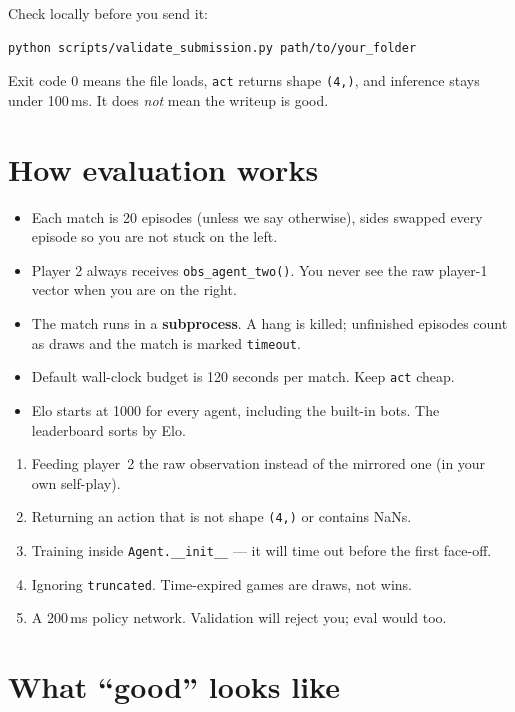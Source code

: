 \documentclass[11pt,a4paper]{article}
\begin{document}
Check locally before you send it:

\begin{lstlisting}
python scripts/validate_submission.py path/to/your_folder
\end{lstlisting}

Exit code 0 means the file loads, \texttt{act} returns shape \texttt{(4,)}, and inference stays under 100\,ms. It does \emph{not} mean the writeup is good.

\section{How evaluation works}

\begin{itemize}
  \item Each match is 20 episodes (unless we say otherwise), sides swapped every episode so you are not stuck on the left.
  \item Player 2 always receives \texttt{obs\_agent\_two()}. You never see the raw player-1 vector when you are on the right.
  \item The match runs in a \textbf{subprocess}. A hang is killed; unfinished episodes count as draws and the match is marked \texttt{timeout}.
  \item Default wall-clock budget is 120 seconds per match. Keep \texttt{act} cheap.
  \item Elo starts at 1000 for every agent, including the built-in bots. The leaderboard sorts by Elo.
\end{itemize}

\begin{warnbox}
\begin{enumerate}[leftmargin=1.2em]
  \item Feeding player~2 the raw observation instead of the mirrored one (in your own self-play).
  \item Returning an action that is not shape \texttt{(4,)} or contains NaNs.
  \item Training inside \texttt{Agent.\_\_init\_\_} --- it will time out before the first face-off.
  \item Ignoring \texttt{truncated}. Time-expired games are draws, not wins.
  \item A 200\,ms policy network. Validation will reject you; eval would too.
\end{enumerate}
\end{warnbox}

\section{What ``good'' looks like}
\end{document}
